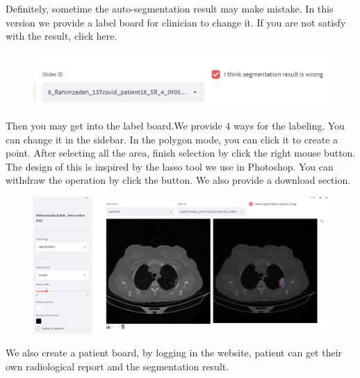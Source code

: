 \documentclass[
]{dtuposter}
\begin{document}
\begin{dtupostercontent}
\begin{figure}
\end{figure}
\par{Definitely, sometime the auto-segmentation result may make mistake. In this version we provide a label board for clinician to change it. If you are not satisfy with the result, click here.}
\begin{figure}
    \centering\includegraphics[width=.5\linewidth,origin=c]{external/figure/changingbutton.png}
\end{figure}
\par{Then you may get into the label board.We provide 4 ways for the labeling. You can change it in the sidebar. 
In the polygon mode, you can click it to create a point. After selecting all the area, finish selection by click the right mouse button. The design of this is inspired by the lasso tool we use in Photoshop.
You can withdraw the operation by click the button. We also provide a download section.
}
\begin{figure}
    \centering\includegraphics[width=1\linewidth,origin=c]{external/figure/label board.png}
\end{figure}
\par{We also create a patient board, by logging in the website, patient can get their own radiological report and the segmentation result.}


\end{dtupostercontent}
\end{document}
